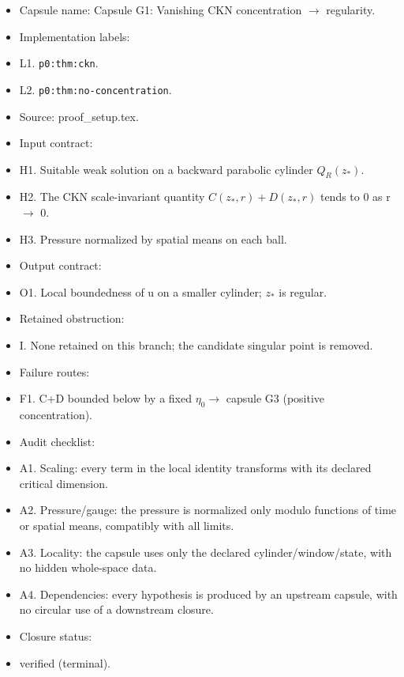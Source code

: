 \documentclass[11pt]{amsart}
\begin{document}
\begin{itemize}
  \item Capsule name: Capsule G1: Vanishing CKN concentration $\to$ regularity.
  \item Implementation labels:
  \item L1. \texttt{p0:thm:ckn}.
  \item L2. \texttt{p0:thm:no-concentration}.
  \item Source: proof\_setup.tex.
  \item Input contract:
  \item H1. Suitable weak solution on a backward parabolic cylinder $Q_R(z_*)$.
  \item H2. The CKN scale-invariant quantity $C(z_*,r)+D(z_*,r)$ tends to 0 as r $\to$ 0.
  \item H3. Pressure normalized by spatial means on each ball.
  \item Output contract:
  \item O1. Local boundedness of u on a smaller cylinder; $z_*$ is regular.
  \item Retained obstruction:
  \item I. None retained on this branch; the candidate singular point is removed.
  \item Failure routes:
  \item F1. C+D bounded below by a fixed $\eta_0 \to$ capsule G3 (positive concentration).
  \item Audit checklist:
  \item A1. Scaling: every term in the local identity transforms with its declared critical dimension.
  \item A2. Pressure/gauge: the pressure is normalized only modulo functions of time or spatial means, compatibly with all limits.
  \item A3. Locality: the capsule uses only the declared cylinder/window/state, with no hidden whole-space data.
  \item A4. Dependencies: every hypothesis is produced by an upstream capsule, with no circular use of a downstream closure.
  \item Closure status:
  \item verified (terminal).
\end{itemize}
\end{document}
